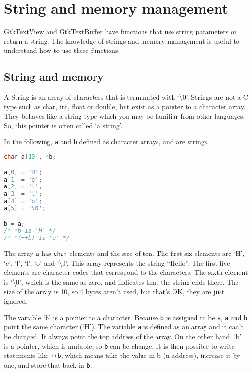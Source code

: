 \hypertarget{string-and-memory-management}{%
\section{String and memory
management}\label{string-and-memory-management}}

GtkTextView and GtkTextBuffer have functions that use string parameters
or return a string. The knowledge of strings and memory management is
useful to understand how to use these functions.

\hypertarget{string-and-memory}{%
\subsection{String and memory}\label{string-and-memory}}

A String is an array of characters that is terminated with
`\textbackslash0'. Strings are not a C type such as char, int, float or
double, but exist as a pointer to a character array. They behaves like a
string type which you may be familiar from other languages. So, this
pointer is often called `a string'.

In the following, \passthrough{\lstinline!a!} and
\passthrough{\lstinline!b!} defined as character arrays, and are
strings.

\begin{lstlisting}[language=C]
char a[10], *b;

a[0] = 'H';
a[1] = 'e';
a[2] = 'l';
a[3] = 'l';
a[4] = 'o';
a[5] = '\0';

b = a;
/* *b is 'H' */
/* *(++b) is 'e' */
\end{lstlisting}

The array \passthrough{\lstinline!a!} has \passthrough{\lstinline!char!}
elements and the size of ten. The first six elements are `H', `e', `l',
`l', `o' and `\textbackslash0'. This array represents the string
``Hello''. The first five elements are character codes that correspond
to the characters. The sixth element is `\textbackslash0', which is the
same as zero, and indicates that the string ends there. The size of the
array is 10, so 4 bytes aren't used, but that's OK, they are just
ignored.

The variable `b' is a pointer to a character. Because
\passthrough{\lstinline!b!} is assigned to be
\passthrough{\lstinline!a!}, \passthrough{\lstinline!a!} and
\passthrough{\lstinline!b!} point the same character (`H'). The variable
\passthrough{\lstinline!a!} is defined as an array and it can't be
changed. It always point the top address of the array. On the other
hand, `b' is a pointer, which is mutable, so \passthrough{\lstinline!b!}
can be change. It is then possible to write statements like
\passthrough{\lstinline!++b!}, which means take the value in b (n
address), increase it by one, and store that back in
\passthrough{\lstinline!b!}.

